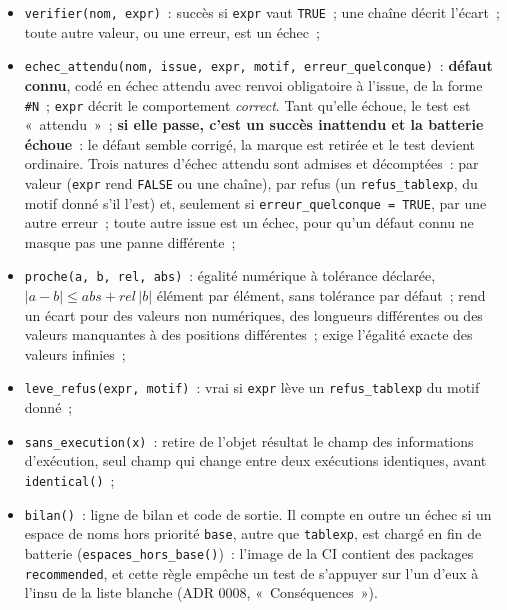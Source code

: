 \documentclass[a4paper,11pt]{article}
\newcommand{\code}[1]{\texttt{\small #1}}
\begin{document}
\begin{itemize}[leftmargin=*, itemsep=2pt]
  \item \code{verifier(nom, expr)}~: succès si \code{expr} vaut \code{TRUE}~;
    une chaîne décrit l'écart~; toute autre valeur, ou une erreur, est un
    échec~;
  \item \code{echec\_attendu(nom, issue, expr, motif, erreur\_quelconque)}~:
    \textbf{défaut connu}, codé en échec attendu avec renvoi obligatoire à
    l'issue, de la forme \code{\#N}~; \code{expr} décrit le comportement
    \emph{correct}. Tant qu'elle échoue, le test est «~attendu~»~; \textbf{si
    elle passe, c'est un succès inattendu et la batterie échoue}~: le défaut
    semble corrigé, la marque est retirée et le test devient ordinaire. Trois
    natures d'échec attendu sont admises et décomptées~: par valeur
    (\code{expr} rend \code{FALSE} ou une chaîne), par refus (un
    \code{refus\_tablexp}, du motif donné s'il l'est) et, seulement si
    \code{erreur\_quelconque = TRUE}, par une autre erreur~; toute autre issue
    est un échec, pour qu'un défaut connu ne masque pas une panne différente~;
  \item \code{proche(a, b, rel, abs)}~: égalité numérique à tolérance déclarée,
    $|a-b| \le \mathit{abs} + \mathit{rel}\,|b|$ élément par élément, sans
    tolérance par défaut~; rend un écart pour des valeurs non numériques, des
    longueurs différentes ou des valeurs manquantes à des positions
    différentes~; exige l'égalité exacte des valeurs infinies~;
  \item \code{leve\_refus(expr, motif)}~: vrai si \code{expr} lève un
    \code{refus\_tablexp} du motif donné~;
  \item \code{sans\_execution(x)}~: retire de l'objet résultat le champ des
    informations d'exécution, seul champ qui change entre deux exécutions
    identiques, avant \code{identical()}~;
  \item \code{bilan()}~: ligne de bilan et code de sortie. Il compte en outre
    un échec si un espace de noms hors priorité \code{base}, autre que
    \code{tablexp}, est chargé en fin de batterie (\code{espaces\_hors\_base()})~:
    l'image de la CI contient des packages \code{recommended}, et cette règle
    empêche un test de s'appuyer sur l'un d'eux à l'insu de la liste blanche
    (ADR 0008, «~Conséquences~»).
\end{itemize}
\end{document}

